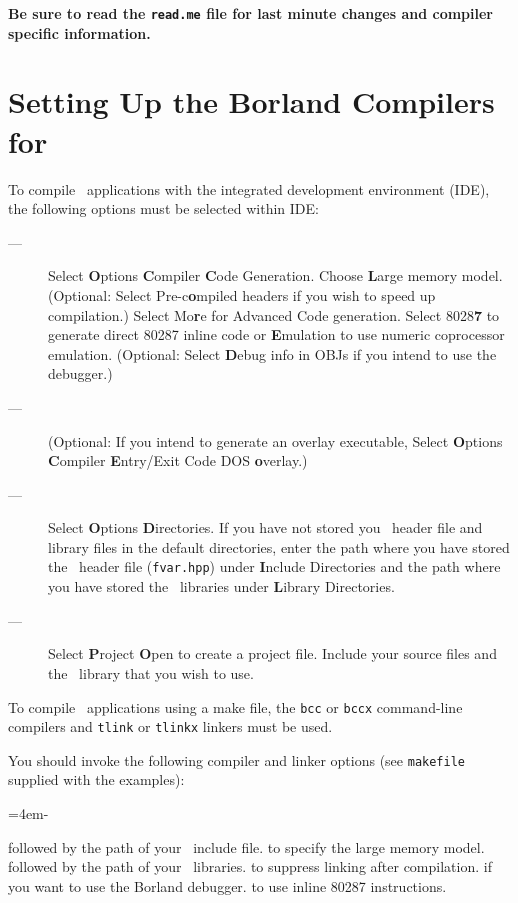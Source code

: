 \documentclass[12pt]{book}
\begin{document}
{\bf Be sure to read the {\tt read.me} file for last minute changes and
compiler specific information.}

\section{Setting Up the Borland Compilers for \AD}
To compile \AD\ applications with the integrated development environment
(IDE), the following options must be selected within IDE:
\begin{description}
\item[---]Select {\bf O}ptions {\bf C}ompiler {\bf C}ode Generation.
Choose {\bf L}arge memory model. 
(Optional: Select Pre-c{\bf o}mpiled 
headers if you wish to speed up compilation.)
Select Mo{\bf r}e for Advanced Code generation. Select 8028{\bf 7} to
generate direct 80287 inline code or {\bf E}mulation to use numeric
coprocessor emulation. 
(Optional: Select {\bf D}ebug info in OBJs if you intend to use the
debugger.)
\item[---](Optional: If you intend to generate an overlay executable,
Select {\bf O}ptions {\bf C}ompiler {\bf E}ntry/Exit Code DOS {\bf o}verlay.)
\item[---]Select {\bf O}ptions {\bf D}irectories. If you have not stored
you \AD\ header file and library files in the default directories,
enter the path where you have stored the \AD\ header file ({\tt fvar.hpp})
under {\bf I}nclude Directories and the path where you have stored the
\AD\ libraries under {\bf L}ibrary Directories.
\item[---]Select {\bf P}roject {\bf O}pen to create a project file.
Include your source files and the \AD\ library that you wish to use.
\end{description}
\par

To compile \AD\ applications using a make file, the {\tt bcc} or {\tt bccx}
command-line compilers and {\tt tlink} or {\tt tlinkx} linkers must be used.

You should invoke the following
compiler and linker options (see {\tt makefile} supplied with the examples):
\par{\parindent=4em\openup-\spread\openup -3pt
\begin{description}
followed by the path of your \AD\ include file.
to specify the large memory model.
followed by the path of your \AD\ libraries.
to suppress linking after compilation.
if you want to use the Borland debugger.
 to use inline 80287 instructions.
\end{description}
\par}
\end{document}
